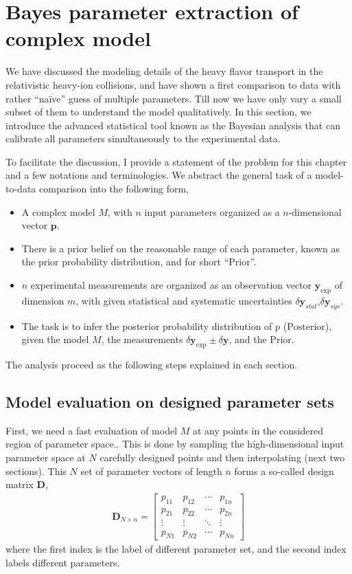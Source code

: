 \chapter{Bayes parameter extraction of complex model}
\label{chapter:bayes}
We have discussed the modeling details of the heavy flavor transport in the relativistic heavy-ion collisions, and have shown a first comparison to data with rather ``na\"ive'' guess of multiple parameters.
Till now we have only vary a small subset of them to understand the model qualitatively.
In this section, we introduce the advanced statistical tool known as the Bayesian analysis that can calibrate all parameters simultaneously to the experimental data.

To facilitate the discussion, I provide a statement of the problem for this chapter and a few notations and terminologies.
We abstract the general task of a model-to-data comparison into the following form,
\begin{itemize}
\item A complex model $M$, with $n$ input parameters organized as a $n$-dimensional vector $\mathbf{p}$.
\item There is a prior belief on the reasonable range of each parameter, known as the prior probability distribution, and for short ``$\mathrm{Prior}$''.
\item $n$ experimental measurements are organized as an observation vector $\mathbf{y}_{\exp}$ of dimension $m$, with given statistical and systematic uncertainties $\delta\mathbf{y}_{stat}$,$\delta\mathbf{y}_{sys}$.
\item The task is to infer the posterior probability distribution of $p$ ($\mathrm{Posterior}$), given the model $M$, the measurements $\delta\mathbf{y}_{\exp}\pm \delta \mathbf{y}$, and the $\mathrm{Prior}$.
\end{itemize}
The analysis proceed as the following steps explained in each section.

\section{Model evaluation on designed parameter sets}
First, we need a fast evaluation of model $M$ at any points in the considered region of parameter space..
This is done by sampling the high-dimensional input parameter space at $N$ carefully designed points and then interpolating (next two sections).
This $N$ set of parameter vectors of length $n$ forms a so-called design matrix $\mathbf{D}$,
\begin{eqnarray}
\mathbf{D}_{N\times n} = 
\begin{bmatrix}
p_{11} & p_{12} & \cdots & p_{1n}\\
p_{21} & p_{22} & \cdots & p_{2n}\\
\vdots & \vdots & \ddots & \vdots \\
p_{N1} & p_{N2} & \cdots & p_{Nn}
\end{bmatrix}
\end{eqnarray}
where the first index is the label of different parameter set, and the second index labels different parameters.

